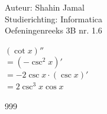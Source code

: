 \documentclass[a4paper]{article}
\begin{document}
  
\noindent \large Auteur: Shahin Jamal \\
\noindent \large Studierichting: Informatica\\
\noindent \large Oefeningenreeks 3B nr. 1.6\\

\medskip

\normalsize

$(\cot x)''$\\

$= (-\csc^2 x)'$\\

$= -2\csc x \cdot (\csc x)'$\\

$= 2\csc^3x \cos x$\\

\begin{thebibliography}{999}
\end{thebibliography}
\end{document}
